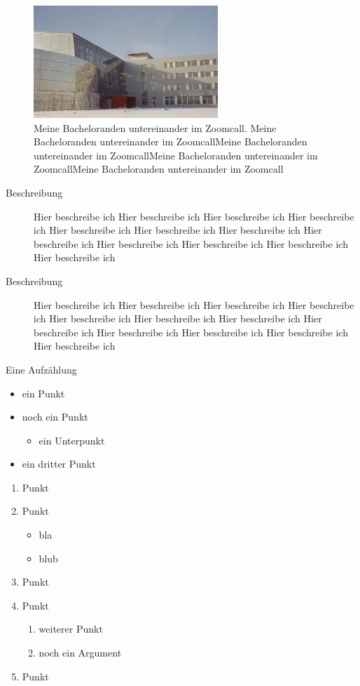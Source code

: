 \begin{figure}
	\centering
	\includegraphics{bilder/garching.jpg}
	\caption[Meine Bacheloranden]{Meine Bacheloranden untereinander im Zoomcall. Meine Bacheloranden untereinander im ZoomcallMeine Bacheloranden untereinander im ZoomcallMeine Bacheloranden untereinander im ZoomcallMeine Bacheloranden untereinander im Zoomcall}
	\label{fig:screenshot}
\end{figure}
\begin{description}
	\item[ Beschreibung] Hier beschreibe ich Hier beschreibe ich Hier beschreibe ich Hier beschreibe ich Hier beschreibe ich Hier beschreibe ich Hier beschreibe ich Hier beschreibe ich Hier beschreibe ich Hier beschreibe ich Hier beschreibe ich Hier beschreibe ich 
	
	\item[ Beschreibung] Hier beschreibe ich Hier beschreibe ich Hier beschreibe ich Hier beschreibe ich Hier beschreibe ich Hier beschreibe ich Hier beschreibe ich Hier beschreibe ich Hier beschreibe ich Hier beschreibe ich Hier beschreibe ich Hier beschreibe ich 
\end{description}
Eine Aufzählung
\begin{itemize}
	\item ein Punkt
	\item noch ein Punkt 
	\begin{itemize}
		\item ein Unterpunkt
	\end{itemize}
	\item ein dritter Punkt
\end{itemize}

\begin{enumerate}
	\item Punkt
	\item Punkt
	\begin{itemize}
		\item bla
		\item blub
	\end{itemize}
	\item Punkt
	\item Punkt
	\begin{enumerate}
		\item weiterer Punkt
		\item noch ein Argument
	\end{enumerate}
	\item Punkt
	
\end{enumerate}
